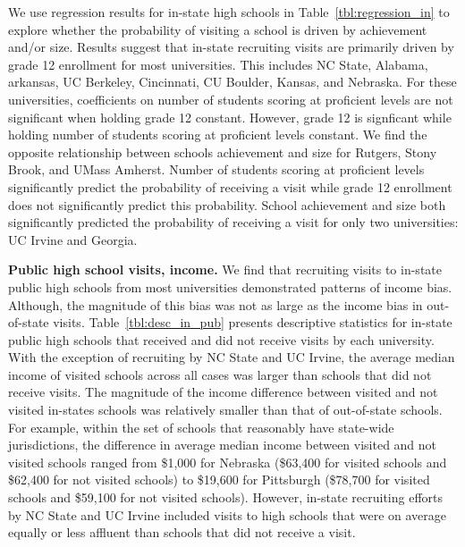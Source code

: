 \documentclass[twoside]{article}
\begin{document}


We use regression results for in-state high schools in Table~\ref{tbl:regression_in} to explore whether the probability of visiting a school is driven by achievement and/or size. Results suggest that in-state recruiting visits are primarily driven by grade 12 enrollment for most universities. This includes NC State, Alabama, arkansas, UC Berkeley, Cincinnati, CU Boulder, Kansas, and Nebraska. For these universities, coefficients on number of students scoring at proficient levels are not significant when holding grade 12 constant. However, grade 12 is signficant while holding number of students scoring at proficient levels constant. We find the opposite relationship between schools achievement and size for Rutgers, Stony Brook, and UMass Amherst. Number of students scoring at proficient levels significantly predict the probability of receiving a visit while grade 12 enrollment does not significantly predict this probability. School achievement and size both significantly predicted the probability of receiving a visit for only two universities: UC Irvine and Georgia.

\textbf{Public high school visits, income.} We find that recruiting visits to in-state public high schools from most universities demonstrated patterns of income bias. Although, the magnitude of this bias was not as large as the income bias in out-of-state visits. Table~\ref{tbl:desc_in_pub} presents descriptive statistics for in-state public high schools that received and did not receive visits by each university.  With the exception of recruiting by NC State and UC Irvine, the average median income of visited schools across all cases was larger than schools that did not receive visits. The magnitude of the income difference between visited and not visited in-states schools was relatively smaller than that of out-of-state schools. For example, within the set of schools that reasonably have state-wide jurisdictions, the difference in average median income between visited and not visited schools ranged from \$1,000 for Nebraska (\$63,400 for visited schools and \$62,400 for not visited schools) to \$19,600 for Pittsburgh (\$78,700 for visited schools and \$59,100 for not visited schools). However, in-state recruiting efforts by NC State and UC Irvine included visits to high schools that were on average equally or less affluent than schools that did not receive a visit.
\end{document}
